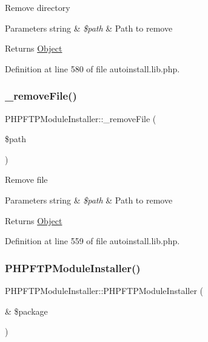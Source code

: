 Remove directory


\begin{DoxyParams}[1]{Parameters}
string & {\em \$path} & Path to remove \\
\hline
\end{DoxyParams}
\begin{DoxyReturn}{Returns}
\hyperlink{classObject}{Object} 
\end{DoxyReturn}


Definition at line 580 of file autoinstall.\+lib.\+php.

\mbox{\label{classPHPFTPModuleInstaller_a6bfd41813d9f70b9e2ee06deb709742f}} 
\subsubsection{\texorpdfstring{\+\_\+remove\+File()}{\_removeFile()}}
{\footnotesize\ttfamily P\+H\+P\+F\+T\+P\+Module\+Installer\+::\+\_\+remove\+File (\begin{DoxyParamCaption}\item[{}]{\$path }\end{DoxyParamCaption})}

Remove file


\begin{DoxyParams}[1]{Parameters}
string & {\em \$path} & Path to remove \\
\hline
\end{DoxyParams}
\begin{DoxyReturn}{Returns}
\hyperlink{classObject}{Object} 
\end{DoxyReturn}


Definition at line 559 of file autoinstall.\+lib.\+php.

\mbox{\label{classPHPFTPModuleInstaller_a8bd8f79d6614af9e7d28ee497dc9eea1}} 
\subsubsection{\texorpdfstring{P\+H\+P\+F\+T\+P\+Module\+Installer()}{PHPFTPModuleInstaller()}}
{\footnotesize\ttfamily P\+H\+P\+F\+T\+P\+Module\+Installer\+::\+P\+H\+P\+F\+T\+P\+Module\+Installer (\begin{DoxyParamCaption}\item[{\&}]{\$package }\end{DoxyParamCaption})}



